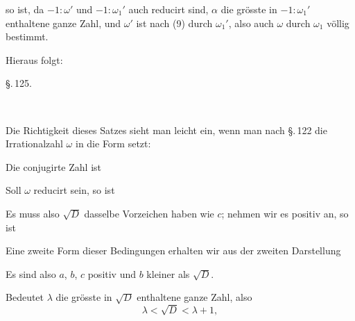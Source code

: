 
so ist, da $-1:\omega'$ und $-1:\omega_1'$ auch reducirt sind, $\alpha$ die grösste in $-1:\omega_1'$ enthaltene ganze Zahl, und $\omega'$ ist nach (9) durch $\omega_1'$, also auch $\omega$ durch $\omega_1$ völlig bestimmt.

Hieraus folgt:


\begin{center}
\S.\,125.

\\
\end{center}


Die Richtigkeit dieses Satzes sieht man leicht ein, wenn man nach \S.\,122 die Irrationalzahl $\omega$ in die Form setzt:


Die conjugirte Zahl ist


Soll $\omega$ reducirt sein, so ist


Es muss also $\sqrt{D}$ dasselbe Vorzeichen haben wie $c$; nehmen wir es positiv an, so ist


Eine zweite Form dieser Bedingungen erhalten wir aus der zweiten Darstellung


Es sind also $a$, $b$, $c$ positiv und $b$ kleiner als $\sqrt{D}$.

Bedeutet $\lambda$ die grösste in $\sqrt{D}$ enthaltene ganze Zahl, also
\[
\lambda < \sqrt{D} < \lambda + 1,
\]
